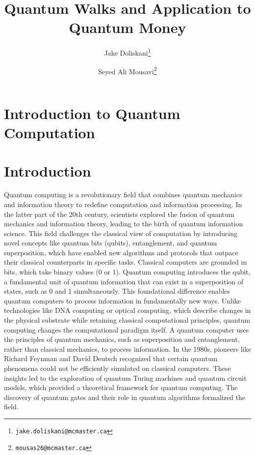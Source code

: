 \documentclass[11pt]{article}
\title{Quantum Walks and Application to Quantum Money}
\author{Jake Doliskani\thanks{\tt jake.doliskani@mcmaster.ca} }
\author{Seyed Ali Mousavi\thanks{\tt mousas26@mcmaster.ca} }
\affil{Department of Computing and Software, McMaster University}
\date{}
\theoremstyle{definition}
\begin{document}
\maketitle



\newpage
\section{Introduction to Quantum Computation}
\label{sec:intro}


\section*{Introduction}

Quantum computing is a revolutionary field that combines quantum mechanics and information theory to redefine computation and information processing. In the latter part of the 20th century, scientists explored the fusion of quantum mechanics and information theory, leading to the birth of quantum information science. This field challenges the classical view of computation by introducing novel concepts like quantum bits (qubits), entanglement, and quantum superposition, which have enabled new algorithms and protocols that outpace their classical counterparts in specific tasks. Classical computers are grounded in bits, which take binary values (0 or 1). Quantum computing introduces the qubit, a fundamental unit of quantum information that can exist in a superposition of states, such as 0 and 1 simultaneously. This foundational difference enables quantum computers to process information in fundamentally new ways. Unlike technologies like DNA computing or optical computing, which describe changes in the physical substrate while retaining classical computational principles, quantum computing changes the computational paradigm itself. A quantum computer uses the principles of quantum mechanics, such as superposition and entanglement, rather than classical mechanics, to process information. In the 1980s, pioneers like Richard Feynman and David Deutsch recognized that certain quantum phenomena could not be efficiently simulated on classical computers. These insights led to the exploration of quantum Turing machines and quantum circuit models, which provided a theoretical framework for quantum computing. The discovery of quantum gates and their role in quantum algorithms formalized the field.
\end{document}
